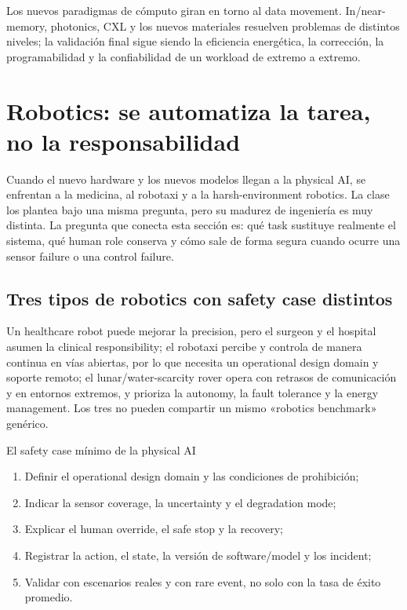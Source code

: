 \documentclass[a4paper]{article}
\begin{document}
Los nuevos paradigmas de cómputo giran en torno al data movement. In/near-memory, photonics, CXL y los nuevos materiales resuelven problemas de distintos niveles; la validación final sigue siendo la eficiencia energética, la corrección, la programabilidad y la confiabilidad de un workload de extremo a extremo.
\section{Robotics: se automatiza la tarea, no la responsabilidad}

Cuando el nuevo hardware y los nuevos modelos llegan a la physical AI, se enfrentan a la medicina, al robotaxi y a la harsh-environment robotics. La clase los plantea bajo una misma pregunta, pero su madurez de ingeniería es muy distinta. La pregunta que conecta esta sección es: qué task sustituye realmente el sistema, qué human role conserva y cómo sale de forma segura cuando ocurre una sensor failure o una control failure.

\subsection{Tres tipos de robotics con safety case distintos}

Un healthcare robot puede mejorar la precision, pero el surgeon y el hospital asumen la clinical responsibility; el robotaxi percibe y controla de manera continua en vías abiertas, por lo que necesita un operational design domain y soporte remoto; el lunar/water-scarcity rover opera con retrasos de comunicación y en entornos extremos, y prioriza la autonomy, la fault tolerance y la energy management. Los tres no pueden compartir un mismo «robotics benchmark» genérico.

\begin{importantbox}{El safety case mínimo de la physical AI}
\begin{enumerate}
  \item Definir el operational design domain y las condiciones de prohibición;
  \item Indicar la sensor coverage, la uncertainty y el degradation mode;
  \item Explicar el human override, el safe stop y la recovery;
  \item Registrar la action, el state, la versión de software/model y los incident;
  \item Validar con escenarios reales y con rare event, no solo con la tasa de éxito promedio.
\end{enumerate}
\end{importantbox}
\end{document}
